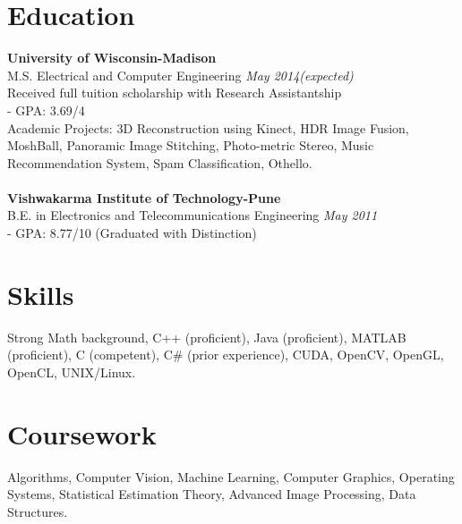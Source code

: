 \documentclass[margin]{res}
\begin{document}
 

 

\address{thite@wisc.edu\\(408) 601-9349\\https://github.com/aashishthite‎}
\address{2110 University Avenue, Apt. 104, \\Madison, WI-53726,\\USA.}

 
\begin{resume} 
 

\section{Education} 
{\bf University of Wisconsin-Madison} \\
M.S. Electrical and Computer Engineering \hfill {\it May 2014(expected)} \\
Received full tuition scholarship with Research Assistantship \\
- GPA: 3.69/4 \\
Academic Projects: 3D Reconstruction using Kinect, HDR Image Fusion, MoshBall, Panoramic Image Stitching, Photo-metric Stereo, Music Recommendation System, Spam Classification, Othello.
\\ \\
{\bf Vishwakarma Institute of Technology-Pune} \\
B.E. in Electronics and Telecommunications Engineering \hfill {\it May 2011} \\
- GPA: 8.77/10 (Graduated with Distinction)
\section{Skills}
Strong Math background, C++ (proficient), Java (proficient), MATLAB (proficient), C (competent), C\# (prior experience), CUDA, OpenCV, OpenGL, OpenCL, UNIX/Linux.

\section{Coursework}
Algorithms, Computer Vision, Machine Learning, Computer Graphics, Operating Systems, Statistical Estimation Theory, Advanced Image Processing, Data Structures.


\end{resume}
\end{document}
